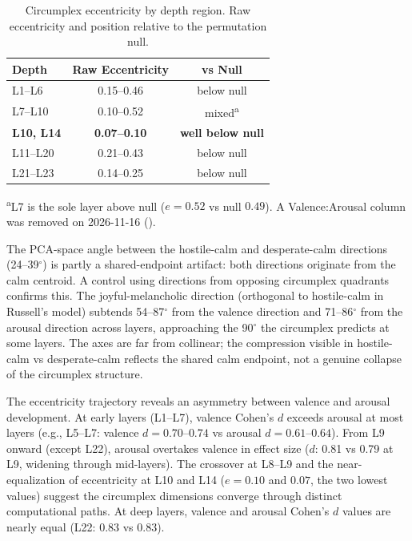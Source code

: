 \documentclass[11pt,a4paper]{article}
\begin{document}
\begin{table}[H]
\centering
\caption{Circumplex eccentricity by depth region. Raw eccentricity and
position relative to the permutation null.}
\label{tab:eccentricity}
\begin{tabular}{lcc}
\toprule
Depth & Raw Eccentricity & vs Null \\
\midrule
L1--L6   & 0.15--0.46 & below null \\
L7--L10  & 0.10--0.52 & mixed\textsuperscript{a} \\
\textbf{L10, L14} & \textbf{0.07--0.10} & \textbf{well below null} \\
L11--L20 & 0.21--0.43 & below null \\
L21--L23 & 0.14--0.25 & below null \\
\bottomrule
\end{tabular}

\smallskip\noindent
\textsuperscript{a}L7 is the sole layer above null ($e{=}0.52$ vs null $0.49$).
A Valence:Arousal column was removed on 2026-11-16 ().
\end{table}

The PCA-space angle between the hostile-calm and desperate-calm
directions (24--39$^\circ$) is partly a shared-endpoint artifact: both
directions originate from the calm centroid. A control using directions
from opposing circumplex quadrants confirms this. The joyful-melancholic
direction (orthogonal to hostile-calm in Russell's model) subtends
54--87$^\circ$ from the valence direction and 71--86$^\circ$ from the
arousal direction across layers, approaching the 90$^\circ$ the
circumplex predicts at some layers. The axes are far from collinear;
the compression visible in hostile-calm vs desperate-calm reflects
the shared calm endpoint, not a genuine collapse of the circumplex
structure.

The eccentricity trajectory reveals an asymmetry between valence and
arousal development. At early layers (L1--L7), valence Cohen's $d$
exceeds arousal at most layers (e.g., L5--L7: valence $d = 0.70$--$0.74$
vs arousal $d = 0.61$--$0.64$). From L9 onward (except L22), arousal overtakes
valence in effect size ($d$: 0.81 vs 0.79 at L9, widening through
mid-layers). The crossover at L8--L9 and the near-equalization of
eccentricity at L10 and L14 ($e = 0.10$ and $0.07$, the two lowest
values) suggest the circumplex dimensions converge through distinct
computational paths. At deep layers, valence and arousal Cohen's $d$
values are nearly equal (L22: 0.83 vs 0.83).
\end{document}
